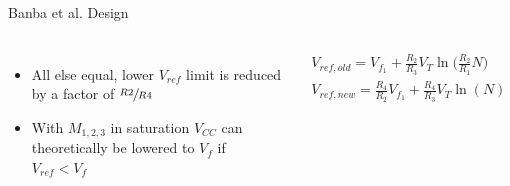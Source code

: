 \documentclass[aspectratio=1610]{beamer} %
\begin{document}
\begin{frame}{Banba et al. Design}{}
    \normalsize
    \begin{columns}[c]
        \begin{itemize}
            \item All else equal, lower \(V_{ref}\) limit is reduced by a factor of \(\sfrac{R2}{R4}\)
            \item With \(M_{1,2,3}\) in saturation \(V_{CC}\) can theoretically be lowered to \(V_{f}\) if \(V_{ref} < V_f\) 
        \end{itemize}
        \small
        \begin{gather}
            V_{ref,old} = V_{f_1} + \frac{R_2}{R_3}V_T\ln\Biggl(\frac{R_2}{R_1}N\Biggr)\nonumber\\
            V_{ref,new} = \frac{R_4}{R_2}V_{f_1} + \frac{R_4}{R_3}V_T \ln{(N)}
        \end{gather}
    

\end{columns}
\end{frame}
\end{document}
